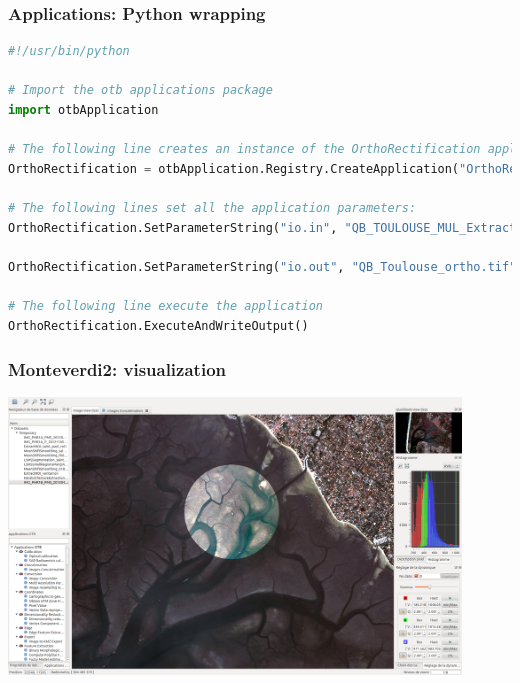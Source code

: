 \documentclass[8pt]{beamer}
\begin{document}
\begin{frame}[fragile]
\frametitle{Applications: Python wrapping}
\begin{lstlisting}[language=python,breaklines=true,breakatwhitespace=true,frame = tb,framerule = 0.25pt,fontadjust,backgroundcolor={\color{listlightgray}},basicstyle = {\ttfamily\tiny},keywordstyle = {\ttfamily\color{listkeyword}\textbf},identifierstyle = {\ttfamily},commentstyle = {\ttfamily\color{listcomment}\textit},stringstyle = {\ttfamily},showstringspaces = false,showtabs = false,numbers = none,numbersep = 6pt, numberstyle={\ttfamily\color{listnumbers}},tabsize = 2]
#!/usr/bin/python 
 
# Import the otb applications package 
import otbApplication 
 
# The following line creates an instance of the OrthoRectification application 
OrthoRectification = otbApplication.Registry.CreateApplication("OrthoRectification") 
 
# The following lines set all the application parameters: 
OrthoRectification.SetParameterString("io.in", "QB_TOULOUSE_MUL_Extract_500_500.tif") 
 
OrthoRectification.SetParameterString("io.out", "QB_Toulouse_ortho.tif") 
 
# The following line execute the application 
OrthoRectification.ExecuteAndWriteOutput()
\end{lstlisting}
\end{frame}


\begin{frame}
\frametitle{Monteverdi2: visualization}
\begin{minipage}[t][6cm][t]{\textwidth}
\begin{center}
\includegraphics[width=0.9\textwidth]{images/monteverdi2-loupe.png}
\end{center}
\end{minipage}
\end{frame}
\end{document}
